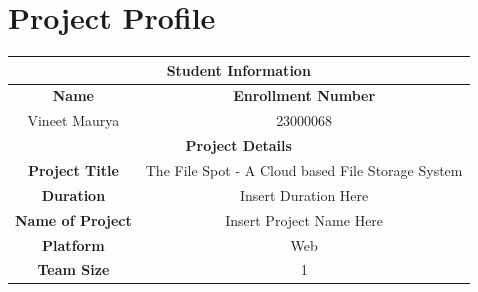 \documentclass[12pt,a4paper]{report}
\begin{document}
\newpage
\chapter*{Project Profile}
\begin{center}
	\begin{tabular}{|c|c|}
		\hline
		\multicolumn{2}{|c|}{\cellcolor{black} \color{white} \textbf{Student Information}} \\
		\hline
		\textbf{Name}            & \textbf{Enrollment Number}                              \\
		Vineet Maurya            & 23000068                                                \\
		\hline
		\multicolumn{2}{|c|}{\cellcolor{black} \color{white} \textbf{Project Details}}     \\
		\hline
		\textbf{Project Title}   & The File Spot - A Cloud based File Storage System       \\
		\hline
		\textbf{Duration}        & Insert Duration Here                                    \\
		\hline
		\textbf{Name of Project} & Insert Project Name Here                                \\
		\hline
		\textbf{Platform}        & Web                                                     \\
		\hline
		\textbf{Team Size}       & 1                                                       \\
		\hline
	\end{tabular}
\end{center}
\newpage
{}
\newpage
\end{document}

